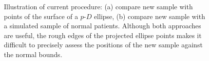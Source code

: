 \documentclass[
  12pt]{article}
\begin{document}
\begin{figure}

\begin{minipage}{0.50\linewidth}



\end{minipage}%
%
\begin{minipage}{0.50\linewidth}



\end{minipage}%

\caption{\label{fig-compare}Illustration of current procedure: (a)
compare new sample with points of the surface of a \(p\text{-}D\)
ellipse, (b) compare new sample with a simulated sample of normal
patients. Although both approaches are useful, the rough edges of the
projected ellipse points makes it difficult to precisely assess the
positions of the new sample against the normal bounds.}

\end{figure}%
\end{document}

